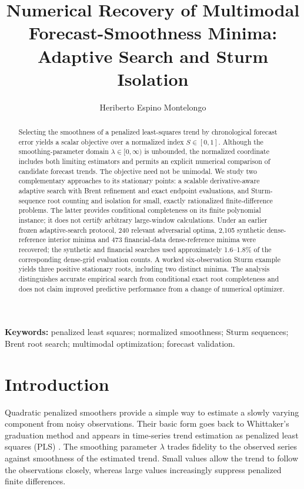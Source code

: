 \documentclass[english]{smcca}
\title{Numerical Recovery of Multimodal Forecast-Smoothness Minima: Adaptive Search and Sturm Isolation}
\author[1]{Heriberto Espino Montelongo}
\affil[1]{Universidad de las Am\'ericas Puebla, San Andr\'es Cholula, Puebla, Mexico.}
\date{}
\begin{document}
\maketitle

\begin{abstract}
Selecting the smoothness of a penalized least-squares trend by
chronological forecast error yields a scalar objective over a
normalized index $S\in[0,1]$. Although the smoothing-parameter
domain $\lambda\in[0,\infty)$ is unbounded, the normalized coordinate
includes both limiting estimators and permits an explicit numerical
comparison of candidate forecast trends. The objective need not
be unimodal. We study two complementary approaches to its stationary
points: a scalable derivative-aware adaptive search with Brent
refinement and exact endpoint evaluations, and Sturm-sequence
root counting and isolation for small, exactly rationalized
finite-difference problems. The latter provides conditional
completeness on its finite polynomial instance; it does not
certify arbitrary large-window calculations. Under an earlier
frozen adaptive-search protocol, 240 relevant adversarial
optima, 2,105 synthetic dense-reference interior minima and
473 financial-data dense-reference minima were recovered;
the synthetic and financial searches used approximately
1.6--1.8\% of the corresponding dense-grid evaluation counts.
A worked six-observation Sturm example yields three positive
stationary roots, including two distinct minima.
The analysis distinguishes accurate empirical search from conditional
exact root completeness and does not claim improved predictive
performance from a change of numerical optimizer.
\end{abstract}

\vspace{1em}

\noindent\textbf{Keywords:} penalized least squares; normalized smoothness; Sturm sequences; Brent root search; multimodal optimization; forecast validation.

\vspace{10pt}

\section{Introduction}

Quadratic penalized smoothers provide a simple way to estimate a slowly varying component from noisy observations. Their basic form goes back to Whittaker's graduation method \cite{whittaker1923graduation} and appears in time-series trend estimation as penalized least squares (PLS) \cite{guerrero2007penalized}. The smoothing parameter \(\lambda\) trades fidelity to the observed series against smoothness of the estimated trend. Small values allow the trend to follow the observations closely, whereas large values increasingly suppress penalized finite differences.
\end{document}
